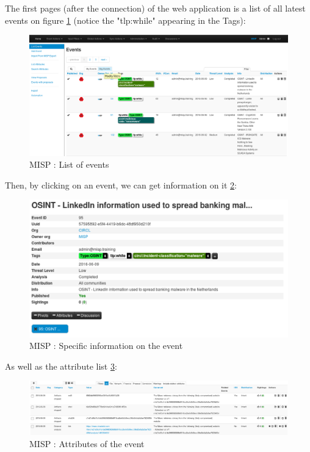 \documentclass{eplmastersthesis}
\begin{document}
The first pages (after the connection) of the web application is a list of all latest events on figure \ref{webevents} (notice the "tlp:while" appearing in the Tags):

\begin{figure}[!h]
	\begin{center}
		\includegraphics[scale=0.32]{res/webEvents}
		\caption{MISP : List of events}
		\label{webevents}
	\end{center}
\end{figure}


Then, by clicking on an event, we can get information on it \ref{webevent}:


\begin{figure}[!h]
	\begin{center}
		\includegraphics[scale=0.35]{res/webEvent}
		\caption{MISP : Specific information on the event}
		\label{webevent}
	\end{center}
\end{figure}


As well as the attribute list \ref{webattributes}:
\begin{figure}[!h]
	\begin{center}
		\includegraphics[scale=0.35]{res/webAttributes}
		\caption{MISP : Attributes of the event}
		\label{webattributes}
	\end{center}
\end{figure}
\end{document}

